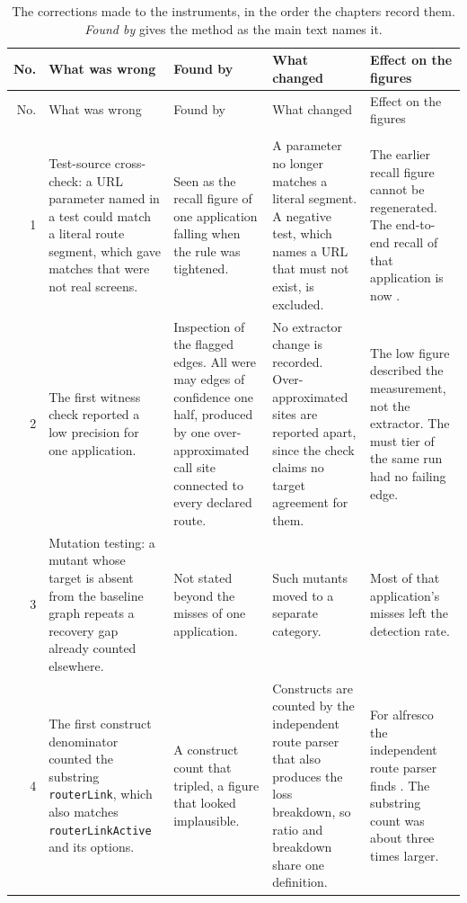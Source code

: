 \begingroup\footnotesize\setlength{\tabcolsep}{2.5pt}
\begin{xltabular}{\textwidth}{@{}rYYYY@{}}
\caption{The corrections made to the instruments, in the order the chapters record them.
\emph{Found by} gives the method as the main text names it.}
\label{tab:repairs}\\
\toprule
No. & What was wrong & Found by & What changed & Effect on the figures \\
\midrule
\endfirsthead
\toprule
No. & What was wrong & Found by & What changed & Effect on the figures \\
\midrule
\endhead
\bottomrule
\endfoot
{} \\
1 & Test-source cross-check: a URL parameter named in a test could match a literal route segment, which gave matches that were not real screens.
  & Seen as the recall figure of one application falling when the rule was tightened.
  & A parameter no longer matches a literal segment. A negative test, which names a URL that must not exist, is excluded.
  & The earlier recall figure cannot be regenerated. The end-to-end recall of that application is now \EtoERateAlfresco{}. \\
2 & The first witness check reported a low precision for one application.
  & Inspection of the flagged edges. All were may edges of confidence one half, produced by one over-approximated call site connected to every declared route.
  & No extractor change is recorded. Over-approximated sites are reported apart, since the check claims no target agreement for them.
  & The low figure described the measurement, not the extractor. The must tier of the same run had no failing edge. \\
3 & Mutation testing: a mutant whose target is absent from the baseline graph repeats a recovery gap already counted elsewhere.
  & Not stated beyond the misses of one application.
  & Such mutants moved to a separate category.
  & Most of that application's misses left the detection rate. \\
4 & The first construct denominator counted the substring \texttt{routerLink}, which also matches \texttt{routerLinkActive} and its options.
  & A construct count that tripled, a figure that looked implausible.
  & Constructs are counted by the independent route parser that also produces the loss breakdown, so ratio and breakdown share one definition.
  & For alfresco the independent route parser finds \ConstructsAlfresco{}. The substring count was about three times larger. \\

\end{xltabular}
